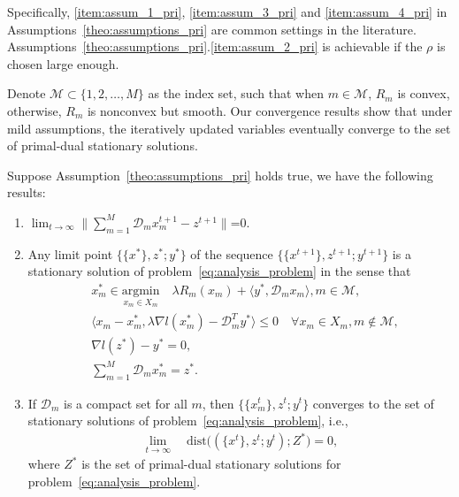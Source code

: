 Specifically, \ref{item:assum_1_pri}, \ref{item:assum_3_pri} and \ref{item:assum_4_pri} in Assumptions~\ref{theo:assumptions_pri} are common settings in the literature. Assumptions~\ref{theo:assumptions_pri}.\ref{item:assum_2_pri} is achievable if the $\rho$ is chosen large enough.

Denote $\mathcal{M}\subset\{1,2,\ldots, M\}$ as the index set, such that when $ m\in\mathcal{M}$, $R_m$ is convex, otherwise, $R_m$ is nonconvex but smooth. Our convergence results show that under mild assumptions, the iteratively updated variables eventually converge to the set of primal-dual stationary solutions. 
\begin{theorem}\label{theo:convergence}
Suppose Assumption~\ref{theo:assumptions_pri} holds true, we have the following results:
\begin{enumerate}
    \item $\lim_{t\rightarrow\infty}\|\sum_{m=1}^{M} \mathcal{D}_mx_m^{t+1} - z^{t+1}\|$=0.\label{item:primal_cond_limit}
    \item Any limit point $\{\{x^*\}, z^*; y^*\}$ of the sequence $\{\{x^{t+1}\}, z^{t+1}; y^{t+1}\}$ is a stationary solution of problem~\eqref{eq:analysis_problem} in the sense that
    \begin{align}
        & x_m^* \in \underset{x_m\in X_m}{\text{argmin}}\quad \lambda R_m(x_m) + \langle y^*, \mathcal{D}_mx_m\rangle, m\in\mathcal{M},\label{eq:cond_x_opt_conv}\\
        & \langle x_m - x_m^*, \lambda\nabla l(x_m^*) - \mathcal{D}_m^T y^* \rangle\le 0\quad\forall x_m\in X_m, m\not\in\mathcal{M}, \label{eq:cond_x_opt_nonconv}\\
        & \nabla l(z^*) - y^* = 0,\label{eq:cond_dual}\\
        & \sum_{m=1}^{M}\mathcal{D}_mx_m^* = z^*.\label{eq:cond_primal}
    \end{align}
    \item If $\mathcal{D}_m$ is a compact set for all $m$, then $\{\{x_m^t\}, z^t; y^t\}$ converges to the set of stationary solutions of problem~\eqref{eq:analysis_problem}, i.e.,
    \begin{align}
        \underset{t\rightarrow\infty}{\lim}\quad\text{dist}\big((\{x^t\}, z^t; y^t);Z^*\big) = 0,\nonumber
    \end{align}
    where $Z^*$ is the set of primal-dual stationary solutions for problem~\eqref{eq:analysis_problem}.
\end{enumerate}
\end{theorem}

